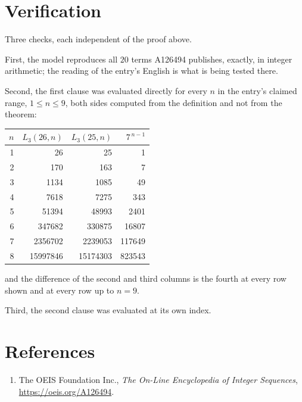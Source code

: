 \documentclass[11pt,a4paper]{article}
\theoremstyle{plain}
\theoremstyle{definition}
\begin{document}
\section{Verification}

Three checks, each independent of the proof above.

First, the model reproduces all $20$ terms A126494 publishes, exactly, in integer
arithmetic; the reading of the entry's English is what is being tested there.

Second, the first clause was evaluated directly for every $n$ in the entry's claimed range,
$1\le n\le9$, both sides computed from the definition and not from the theorem:

\begin{center}
\begin{tabular}{rrrr}
$n$ & $L_{3}(26,n)$ & $L_{3}(25,n)$ & $7^{\,n-1}$ \\ \hline
1 & 26 & 25 & 1 \\
2 & 170 & 163 & 7 \\
3 & 1134 & 1085 & 49 \\
4 & 7618 & 7275 & 343 \\
5 & 51394 & 48993 & 2401 \\
6 & 347682 & 330875 & 16807 \\
7 & 2356702 & 2239053 & 117649 \\
8 & 15997846 & 15174303 & 823543 \\
\end{tabular}
\end{center}

\noindent and the difference of the second and third columns is the fourth at every row shown
and at every row up to $n=9$.

Third, the second clause was evaluated at its own index.

\section*{References}
\begin{enumerate}
\item The OEIS Foundation Inc., \emph{The On-Line Encyclopedia of Integer Sequences},
\url{https://oeis.org/A126494}.
\end{enumerate}
\end{document}
